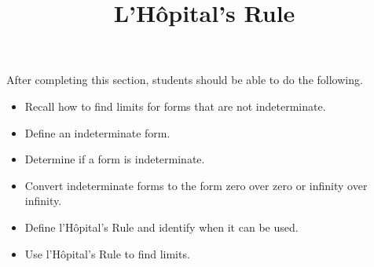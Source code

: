 \documentclass{ximera}
\title{L'H\^{o}pital's Rule}
\begin{document}
\begin{abstract}
\end{abstract}

\maketitle

\begin{sectionOutcomes}

After completing this section, students should be able to do the following.

\begin{itemize}
	\item Recall how to find limits for forms that are not indeterminate.
	\item Define an indeterminate form.
	\item Determine if a form is indeterminate.
	\item Convert indeterminate forms to the form zero over zero
          or infinity over infinity.
	\item Define l'H\^{o}pital's Rule and identify when it can be used.
	\item Use l'H\^{o}pital's Rule to find limits.
\end{itemize}

\end{sectionOutcomes}
\end{document}
